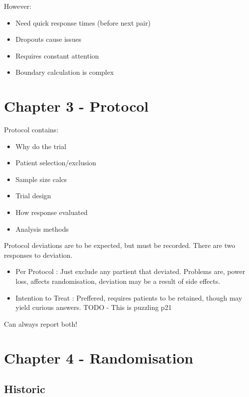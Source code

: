 \documentclass[
  letterpaper,
  DIV=11,
  numbers=noendperiod]{scrreprt}
\providecommand{\tightlist}{%
  \setlength{\itemsep}{0pt}\setlength{\parskip}{0pt}}\usepackage{longtable,booktabs,array}
\begin{document}
However:

\begin{itemize}
\tightlist
\item
  Need quick response times (before next pair)
\item
  Dropouts cause issues
\item
  Requires constant attention
\item
  Boundary calculation is complex
\end{itemize}

\hypertarget{chapter-3---protocol}{%
\section{Chapter 3 - Protocol}\label{chapter-3---protocol}}

Protocol contains:

\begin{itemize}
\tightlist
\item
  Why do the trial
\item
  Patient selection/exclusion
\item
  Sample size calcs
\item
  Trial design
\item
  How response evaluated
\item
  Analysis methods
\end{itemize}

Protocol deviations are to be expected, but must be recorded. There are
two responses to deviation.

\begin{itemize}
\tightlist
\item
  Per Protocol : Just exclude any partient that deviated. Problems are,
  power loss, affects randomisation, deviation may be a result of side
  effects.
\item
  Intention to Treat : Preffered, requires patients to be retained,
  though may yield curious answers. TODO - This is puzzling p21
\end{itemize}

Can always report both!

\hypertarget{chapter-4---randomisation}{%
\section{Chapter 4 - Randomisation}\label{chapter-4---randomisation}}

\hypertarget{historic}{%
\subsection{Historic}\label{historic}}
\end{document}
